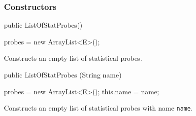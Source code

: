 \subsubsection*{Constructors}
\begin{code}

   public ListOfStatProbes()\begin{hide} {
      probes = new ArrayList<E>();
   }\end{hide}
\end{code}
\begin{tabb}   Constructs an empty list of statistical probes.
\end{tabb}
\begin{code}

   public ListOfStatProbes (String name)\begin{hide} {
      probes = new ArrayList<E>();
      this.name = name;
   }\end{hide}
\end{code}
\begin{tabb}   Constructs an empty list of statistical probes with
  name \texttt{name}.
\end{tabb}
\begin{htmlonly}
\end{htmlonly}
